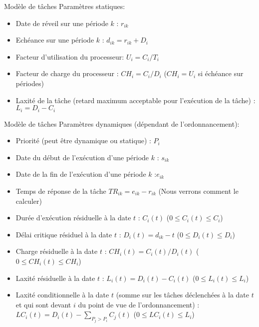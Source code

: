\begin{frame}{Modèle de tâches}
  Paramètres statiques:
  \begin{itemize} 
  \item Date de réveil sur une période $k$ : $r_{ik}$
  \item Echéance sur une période $k$ : $d_{ik} = r_{ik} + D_i$
  \item Facteur d'utilisation du processeur: $U_i =  C_i / T_i$
  \item Facteur de charge du processeur : $CH_i = C_i / D_i $ ($CH_i =
    U_i$ si échéance sur périodes)
  \item Laxité de la tâche (retard maximum acceptable pour l'exécution
    de la tâche) : $L_i = D_i - C_i$
  \end{itemize} 
\end{frame}

\begin{frame}{Modèle de tâches}
  Paramètres dynamiques (dépendant de l'ordonnancement):
  \begin{itemize} 
  \item Priorité (peut être dynamique ou statique) : $P_i$
  \item Date du début de l'exécution d'une période $k$ : $s_{ik}$
  \item Date de la fin de l'exécution d'une période $k$ :$e_{ik}$
  \item Temps de réponse de la tâche $TR_{ik} = e_{ik} - r_{ik}$ (Nous
    verrons comment le calculer)
  \item Durée d'exécution résiduelle à la date $t$ : $C_i(t)$ ($0 ≤
    C_i(t) ≤ C_i$)
  \item Délai  critique résiduel à la  date $t$ :  $D_i(t) = d_{ik}-t$
    ($0 ≤ D_i(t) ≤ D_i$)
  \item Charge résiduelle à la date $t$ :
    $CH_i(t) = C_i(t) / D_i(t)$  ($0 ≤ CH_i(t) ≤ CH_i$)
  \item Laxité  résiduelle à la  date $t$ :
    $L_i(t) = D_i(t) - C_i(t)$  ($0  ≤ L_i(t) ≤  L_i$)
  \item  Laxité conditionnelle  à la  date $t$  (somme sur  les tâches
    déclenchées à la  date $t$ et qui sont devant $i$  du point de vue
    de  l'ordonnancement)  :  $LC_i(t)  =  D_i(t)  -  \sum_{P_j  >
      P_i} C_j(t)$ ($0 ≤ LC_i(t) ≤ L_i$)
  \end{itemize} 
\end{frame}

